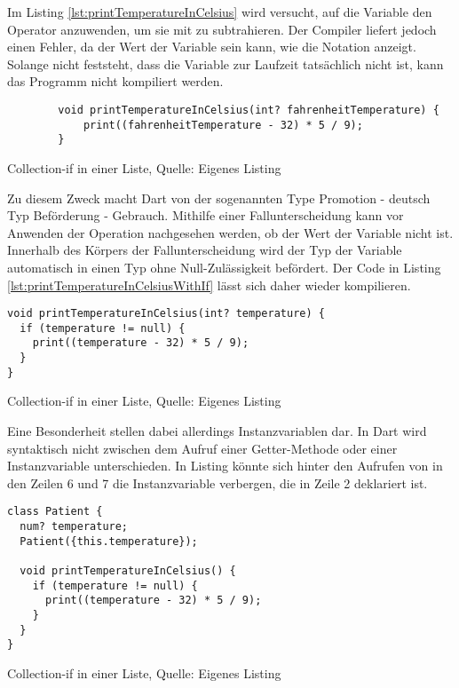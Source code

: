 Im Listing \ref{lst:printTemperatureInCelsius}
wird versucht, auf die Variable  den Operator \IC{-} anzuwenden, um sie mit  zu subtrahieren.
Der Compiler liefert jedoch einen Fehler, da der Wert der Variable  sein kann, wie die Notation  anzeigt.
Solange nicht feststeht, dass die Variable zur Laufzeit tatsächlich nicht  ist, kann das Programm nicht kompiliert werden.

\ifincludeall
  \begin{listing}[ht]
    \begin{verbatim}
        void printTemperatureInCelsius(int? fahrenheitTemperature) {
            print((fahrenheitTemperature - 32) * 5 / 9);
        }
\end{verbatim}
    \caption[Collection-if in einer Liste]{Collection-if in einer Liste, Quelle: Eigenes Listing}
    \label{lst:printTemperatureInCelsius}
  \end{listing}
\fi

Zu diesem Zweck macht Dart von der sogenannten Type Promotion - deutsch Typ Beförderung - Gebrauch.
Mithilfe einer Fallunterscheidung kann vor Anwenden der Operation nachgesehen werden, ob der Wert der Variable nicht  ist.
Innerhalb des Körpers der Fallunterscheidung wird der Typ der Variable automatisch in einen Typ ohne Null-Zulässigkeit befördert.
Der Code in Listing \ref{lst:printTemperatureInCelsiusWithIf} lässt sich daher wieder kompilieren.

\ifincludeall
  \begin{listing}[ht]
    \begin{verbatim}
void printTemperatureInCelsius(int? temperature) {
  if (temperature != null) {
    print((temperature - 32) * 5 / 9);
  }
}
\end{verbatim}
    \caption[Collection-if in einer Liste]{Collection-if in einer Liste, Quelle: Eigenes Listing}
    \label{lst:printTemperatureInCelsiusWithIf}
  \end{listing}
\fi

Eine Besonderheit stellen dabei allerdings Instanzvariablen dar.
In Dart wird syntaktisch nicht zwischen dem Aufruf einer Getter-Methode oder einer Instanzvariable unterschieden.
In Listing \label{lst:Patient}
könnte sich hinter den Aufrufen von  in den Zeilen 6 und 7 die Instanzvariable verbergen, die in Zeile 2 deklariert ist.

\ifincludeall
  \begin{listing}[ht]
    \begin{verbatim}
class Patient {
  num? temperature;
  Patient({this.temperature});

  void printTemperatureInCelsius() {
    if (temperature != null) {
      print((temperature - 32) * 5 / 9);
    }
  }
}
    \end{verbatim}
    \caption[Collection-if in einer Liste]{Collection-if in einer Liste, Quelle: Eigenes Listing}
    \label{lst:PatientWithoutNullCheck}
  \end{listing}
\fi

